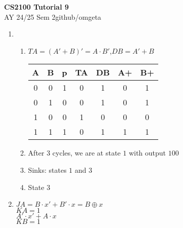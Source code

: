\documentclass[12pt, a4paper]{article}
\newcommand{\mytitle}{CS2100 Tutorial 9}
\newcommand{\myauthor}{github/omgeta}
\newcommand{\mydate}{AY 24/25 Sem 2}
\begin{document}
\raggedright
\footnotesize
\begin{center}
{\normalsize{\textbf{\mytitle}}} \\
{\footnotesize{\mydate\hspace{2pt}\textemdash\hspace{2pt}\myauthor}}
\end{center}
\begin{enumerate}[Q\arabic*.]
  \item 
    \begin{enumerate}[(\alph*.)]
      \item $TA = (A' + B)' = A\cdot B'$,\quad$DB = A'+B$\\ 
        \begin{tabular}{|cc|c|cc|cc|}
        \hline
        \textbf{A} & \textbf{B} & \textbf{p} & \textbf{TA} & \textbf{DB} & \textbf{A+} & \textbf{B+} \\
        \hline
        0 & 0 & 1 & 0 & 1 & 0 & 1\\
        \hline
        0 & 1 & 0 & 0 & 1 & 0 & 1\\
        \hline
        1 & 0 & 0 & 1 & 0 & 0 & 0 \\
        \hline
        1 & 1 & 1 & 0 & 1 & 1 & 1\\
        \hline
        \end{tabular}

      \item After 3 cycles, we are at state $1$ with output $100$ 

      \item Sinks: states $1$ and $3$

      \item State $3$ 
    \end{enumerate}

  \item $JA = B\cdot x' + B'\cdot x = B \oplus x$\\
    $KA = 1$\\
    $A'\cdot x' + A\cdot x$\\
    $KB = 1$


\end{enumerate}
\end{document}
